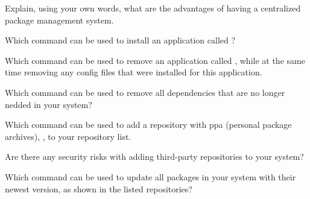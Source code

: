 \begin{exercises}
  \item Explain, using your own words, what are the advantages of having a centralized package management system.
  \item Which command can be used to install an application  called ?
  \item Which command can be used to remove an application called , while at the same time removing any config files that were installed for this application.
  \item Which command can be used to remove all dependencies that are no longer nedded in your system?
  \item Which command can be used to add a repository with ppa (personal package archives), , to your repository list.
  \item Are there any security risks with adding third-party repositories to your system? 
  \item Which command can be used to update all packages in your system with their newest version, as shown in the listed repositories?
\end{exercises}